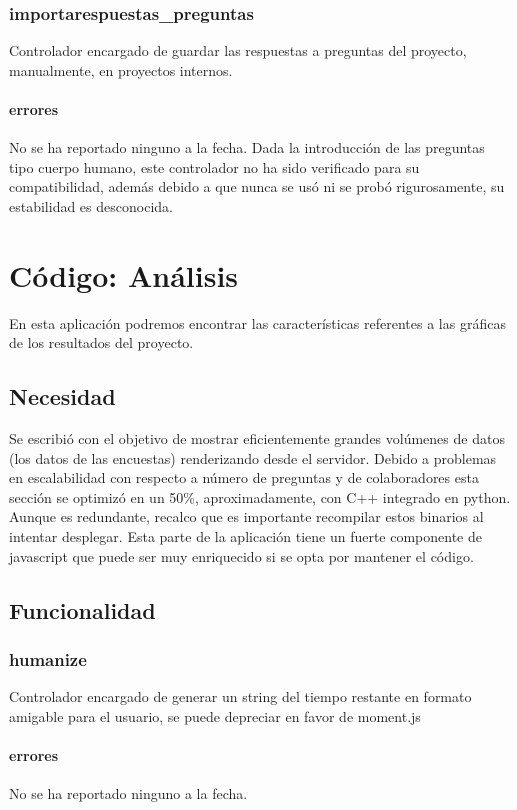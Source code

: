 \documentclass[10pt,a4paper]{book}
\begin{document}
	\subsection{importarespuestas\_preguntas}
	Controlador encargado de guardar las respuestas a preguntas del proyecto, manualmente, en proyectos internos.
	\subsubsection{errores}
	No se ha reportado ninguno a la fecha. Dada la introducción de las preguntas tipo cuerpo humano, este controlador no ha sido verificado para su compatibilidad, además debido a que nunca se usó ni se probó rigurosamente, su estabilidad es desconocida.
	
	\chapter{Código: Análisis}

	En esta aplicación podremos encontrar las características referentes a las gráficas de los resultados del proyecto.

	\section{Necesidad}
	Se escribió con el objetivo de mostrar eficientemente grandes volúmenes de datos (los datos de las encuestas) renderizando desde el servidor. Debido a problemas en escalabilidad con respecto a número de preguntas y de colaboradores esta sección se optimizó en un 50\%, aproximadamente, con C++ integrado en python. Aunque es redundante, recalco que es importante recompilar estos binarios al intentar desplegar. Esta parte de la aplicación tiene un fuerte componente de javascript que puede ser muy enriquecido si se opta por mantener el código.
	
	\section{Funcionalidad}


	\subsection{humanize}
	Controlador encargado de generar un string del tiempo restante en formato amigable para el usuario, se puede depreciar en favor de moment.js
	\subsubsection{errores}
	No se ha reportado ninguno a la fecha.
\end{document}
